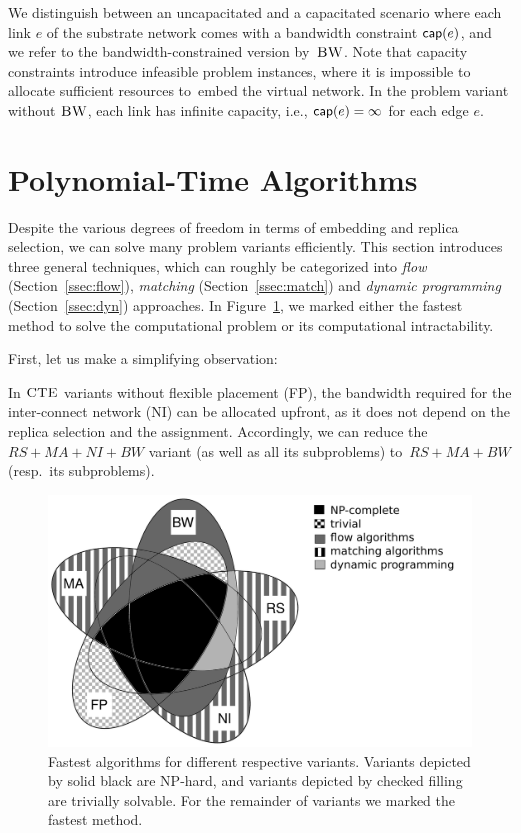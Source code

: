 We distinguish between an uncapacitated and a capacitated scenario where each link $e$
of the substrate network comes with a bandwidth
constraint $\textsf{cap}(e)$, and we refer to the bandwidth-constrained version by~$\textsc{BW}$.
Note that capacity constraints introduce infeasible problem instances, where it is impossible to
allocate sufficient resources to~embed the virtual network.
In the problem variant without $\textsc{BW}$, each link has infinite capacity, i.e., $\textsf{cap}(e) = \infty$ for each edge $e$.

\section{Polynomial-Time Algorithms}\label{sec:poly}


Despite the various degrees of freedom in terms of embedding and replica selection,
we can solve many problem variants efficiently.
 This section introduces three general techniques,
 which can roughly be categorized into
 \emph{flow} (Section~\ref{ssec:flow}), \emph{matching} (Section~\ref{ssec:match}) and \emph{dynamic programming}
 (Section~\ref{ssec:dyn}) approaches.
In Figure~\ref{fig:venn_full}, we marked either the fastest method to solve the computational problem or its computational intractability.
 
First, let us make a simplifying observation:
\begin{obs}\label{obs:nofp}
In $\textsc{CTE}$ variants without flexible placement (FP),
the bandwidth required
for the inter-connect network (NI) can be allocated upfront, 
as it
does not depend on the replica
selection and the assignment.
Accordingly, we can reduce the $RS+MA+NI+BW$ variant (as well as all its subproblems)
to~$RS+MA+BW$ (resp.~its subproblems).
\end{obs}

\begin{figure}[t]
\centering
\includegraphics[width=0.69\columnwidth]{figs/static-mapping/venn_full2}
\caption{Fastest algorithms for different respective variants. Variants depicted by solid black are NP-hard, and variants depicted by checked filling are trivially solvable. For the remainder of variants we marked the fastest method.}
\label{fig:venn_full}
\end{figure}


